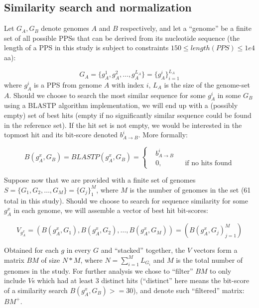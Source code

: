 \subsection{Similarity search and normalization}
\label{simsearch}
Let $G_A, G_B$ denote genomes $A$ and $B$ respectively, and let a ``genome'' be
a finite set of all possible PPSs that can be derived from its nucleotide
sequence (the length of a PPS in this study is subject to constraints $150 \leq
length(PPS) \leq 1e4$ aa):

\begin{equation}
G_A = \{g_A^1, g_A^2, \ldots, g_A^{L_A}\} = \{g_A^i\}_{i=1}^{L_A}
\end{equation}
where $g_A^i$ is a PPS from genome $A$ with index $i$, $L_A$ is the size of
the genome-set $A$.
Should we choose to search the most similar sequence for some $g_A^i$ in some
$G_B$ using a BLASTP \cite{Altschul1990} algorithm implementation, we will end
up with a (possibly empty) set of best hits (empty if no significantly similar
sequence could be found in the reference set). If the hit set is not empty, we
would be interested in the topmost hit and its bit-score denoted $b_{A
\rightarrow B}^i$. More formally:

\begin{equation}
B(g_A^x, G_B) = BLASTP(g_A^x, G_B)=\left \{
\begin{aligned}
&b_{A \rightarrow B}^i\\
&0, && \text{if no hits found}
\end{aligned} \right.
\end{equation}

Suppose now that we are provided with a finite set of genomes \\
$S = \{G_1, G_2, \ldots, G_M\} = \{G_j\}_1^M$, where $M$ is the number of
genomes in the set (61 total in this study). Should we choose to search for
sequence similarity for some $g_A^x$ in each genome, we will assemble a
vector of best hit bit-scores:

\begin{equation}
V_{g_A^x} = (B(g_A^x, G_1), B(g_A^x, G_2), \ldots, B(g_A^x, G_M)) = (B(g_A^x,
G_j)_{j=1}^M)
\end{equation}

Obtained for each $g$ in every $G$ and ``stacked'' together, the $V$ vectors
form a matrix $BM$ of size $N*M$, where $N=\sum_{i=1}^M L_{G_i}$ and $M$ is
the total number of genomes in the study.
For further analysis we chose to ``filter'' $BM$ to only include $V$s which had
at least 3 distinct hits (``distinct'' here means the bit-score of a similarity
search $B(g_A^x, G_B)>=30$), and denote such ``filtered'' matrix: $BM^+$.

